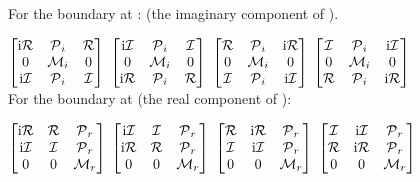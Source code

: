 \documentclass[preprint]{iucr}              %
\numberwithin{equation}{section}
\newcommand{\Imaginary}[0]{\mathcal{I}}
\newcommand{\Real}[0]{\mathcal{R}}
\begin{document}
	
	For the boundary at \sv: (the imaginary component of \cii{}).
	
	$\begin{bmatrix}
		\textrm{i}\Real{}	& \Plus{}_i		& \Real{} \\
		0				& \Minus{}_i	& 0 \\
		\textrm{i}\Imaginary{}	& \Plus{}_i		& \Imaginary{}
	\end{bmatrix}$
	$\begin{bmatrix}
		\textrm{i}\Imaginary{}	& \Plus{}_i		&  \Imaginary{} \\
		0				& \Minus{}_i	& 0 \\
		\textrm{i}\Real{}	& \Plus{}_i	& \Real{} \\
	\end{bmatrix}$ 
	$\begin{bmatrix}
		\Real{}	&\Plus{}_i		&   \textrm{i}\Real{} \\
		0		& \Minus{}_i	&  0 \\
		\Imaginary{}	&\Plus{}_i		& \textrm{i}\Imaginary{}
	\end{bmatrix}	$ 
	$\begin{bmatrix}
		\Imaginary{}	& \Plus{}_i	& \textrm{i}\Imaginary{} \\
		0		&\Minus{}_i	&  0 \\
		\Real{}	& \Plus{}_i	&  \textrm{i}\Real{} \\
	\end{bmatrix}$ \\
	
	
	For the boundary at \siii{} (the real component of \ciii{}):
	
	$\begin{bmatrix}
		
		\textrm{i}\Real{}	& \Real{}	& \Plus{}_r \\
		\textrm{i}\Imaginary{}	& \Imaginary{}	& \Plus{}_r  \\
		0				& 0		& \Minus{}_r  \\
	\end{bmatrix}$
	$\begin{bmatrix}
		\textrm{i}\Imaginary{}	&  \Imaginary{}	& \Plus{}_r \\
		\textrm{i}\Real{}	& \Real{}		& \Plus{}_r \\
		0				& 0			& \Minus{}_r \\
	\end{bmatrix}$ 
	$\begin{bmatrix}
		\Real{}	&   \textrm{i}\Real{}	&\Plus{}_r \\
		\Imaginary{}	& \textrm{i}\Imaginary{}	&\Plus{}_r \\
		0 		&  0				& \Minus{}_r \\
	\end{bmatrix}	$ 
	$\begin{bmatrix}
		\Imaginary{}	& \textrm{i}\Imaginary{}	& \Plus{}_r \\
		\Real{}	&  \textrm{i}\Real{}	& \Plus{}_r \\
		0		&  0				&\Minus{}_r \\
	\end{bmatrix}$ \\
	
\end{document}
